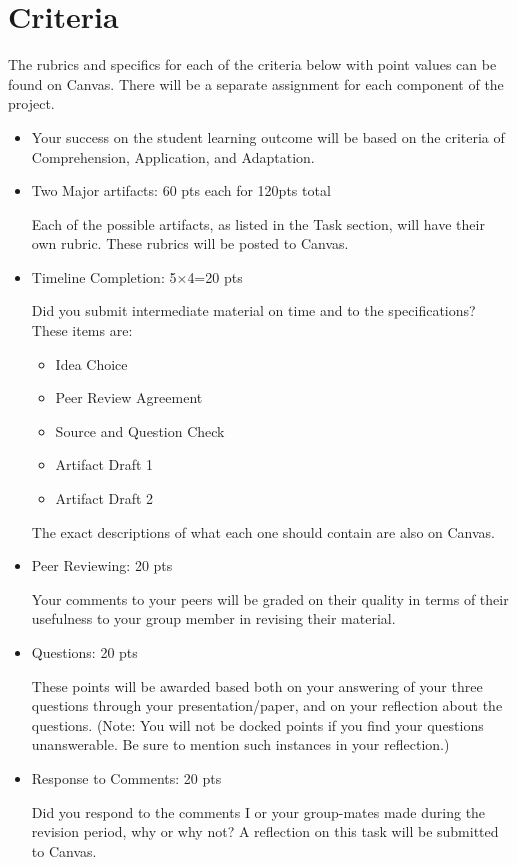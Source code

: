 \documentclass[12pt]{article}
\begin{document}
	\section*{Criteria}
	The rubrics and specifics for each of the criteria below with point values can be found on Canvas.  There will be a separate assignment for each component of the project.
	\begin{itemize}
		\item Your success on the student learning outcome will be based on the criteria of Comprehension, Application, and Adaptation.
		
		\item Two Major artifacts: 60 pts each for 120pts total
		
			Each of the possible artifacts, as listed in the Task section, will have their own rubric. These rubrics will be posted to Canvas.
			
		\item Timeline Completion: 5$\times$4=20 pts
		
			Did you submit intermediate material on time and to the specifications? These items are:
				\begin{itemize}
					\item Idea Choice
					\item Peer Review Agreement
					\item Source and Question Check
					\item Artifact Draft 1
					\item Artifact Draft 2
				\end{itemize}
			The exact descriptions of what each one should contain are also on Canvas.
			
		\item Peer Reviewing: 20 pts
		
			Your comments to your peers will be graded on their quality in terms of their usefulness to your group member in revising their material.
			
		\item Questions: 20 pts
			
			These points will be awarded based both on your answering of your three questions through your presentation/paper, and on your reflection about the questions. (Note: You will not be docked points if you find your questions unanswerable.  Be sure to mention such instances in your reflection.)
		
		\item Response to Comments: 20 pts
		
			Did you respond to the comments I or your group-mates made during the revision period, why or why not? A reflection on this task will be submitted to Canvas.
	\end{itemize}
\end{document}
